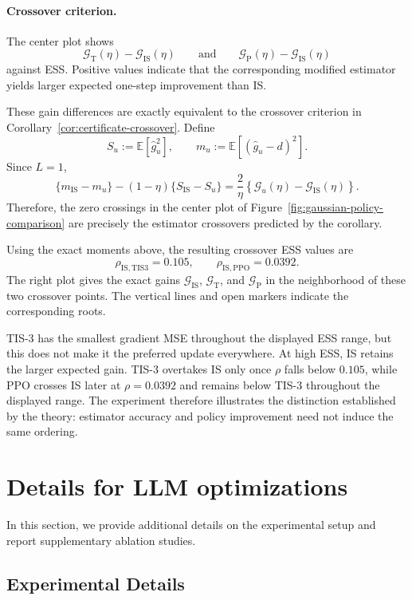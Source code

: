 \documentclass[11pt]{article}
\theoremstyle{remark}
\newcommand{\E}{\mathbb{E}}
\begin{document}
\paragraph{Crossover criterion.}
The center plot shows
\[
\mathcal G_{\mathrm{T}}(\eta)-\mathcal G_{\mathrm{IS}}(\eta)
\qquad\text{and}\qquad
\mathcal G_{\mathrm{P}}(\eta)-\mathcal G_{\mathrm{IS}}(\eta)
\]
against ESS. Positive values indicate that the corresponding modified estimator yields larger expected one-step improvement than IS.

These gain differences are exactly equivalent to the crossover criterion in Corollary~\ref{cor:certificate-crossover}. Define
\[
S_u:=\E[\widehat g_u^2],
\qquad
m_u:=\E[(\widehat g_u-d)^2].
\]
Since $L=1$,
\begin{equation}
\{m_{\mathrm{IS}}-m_u\}
-
(1-\eta)\{S_{\mathrm{IS}}-S_u\}
=
\frac{2}{\eta}
\left\{\mathcal G_u(\eta)-\mathcal G_{\mathrm{IS}}(\eta)\right\}.
\label{eq:gaussian-crossover-identity}
\end{equation}
Therefore, the zero crossings in the center plot of Figure~\ref{fig:gaussian-policy-comparison} are precisely the estimator crossovers predicted by the corollary.

Using the exact moments above, the resulting crossover ESS values are
\[
\rho_{\mathrm{IS,TIS3}}=0.105,
\qquad
\rho_{\mathrm{IS,PPO}}=0.0392.
\]
The right plot gives the exact gains $\mathcal G_{\mathrm{IS}}$, $\mathcal G_{\mathrm{T}}$, and $\mathcal G_{\mathrm{P}}$ in the neighborhood of these two crossover points. The vertical lines and open markers indicate the corresponding roots.

TIS-3 has the smallest gradient MSE throughout the displayed ESS range, but this does not make it the preferred update everywhere. At high ESS, IS retains the larger expected gain. TIS-3 overtakes IS only once $\rho$ falls below $0.105$, while PPO crosses IS later at $\rho=0.0392$ and remains below TIS-3 throughout the displayed range. The experiment therefore illustrates the distinction established by the theory: estimator accuracy and policy improvement need not induce the same ordering.

\section{Details for LLM optimizations}
\label{app:llm-diagnostics}
In this section, we provide additional details on the experimental setup and
report supplementary ablation studies.

\subsection{Experimental Details}
\end{document}

